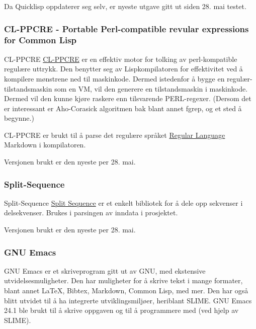 \documentclass[11pt]{article}
\begin{document}
Da Quicklisp oppdaterer seg selv, er nyeste utgave gitt ut siden 28. mai testet.



\subsubsection{CL-PPCRE - Portable Perl-compatible revular expressions for Common Lisp}



CL-PPCRE \href{(http://weitz.de/cl-ppcre/}{CL-PPCRE} er en effektiv motor for tolking av perl-kompatible regulære uttrykk. Den benytter seg av Lispkompilatoren for effektivitet ved å kompilere mønstrene ned til maskinkode. Dermed istedenfor å bygge en regulær-tilstandsmaskin som en VM, vil den generere en tilstandsmaskin i maskinkode. Dermed vil den kunne kjøre raskere enn tilsvarende PERL-regexer. (Dersom det er interessant er Aho-Corasick algoritmen bak blant annet fgrep, og et sted å begynne.)



CL-PPCRE er brukt til å parse det regulære språket \href{(http://en.wikipedia.org/wiki/Regular)language}{Regular Language} Markdown i kompilatoren.



Versjonen brukt er den nyeste per 28. mai.



\subsubsection{Split-Sequence}
Split-Sequence \href{(http://www.cliki.net/split-sequence}{Split Sequence} er et enkelt bibliotek for å dele opp sekvenser i delsekvenser.
Brukes i parsingen av inndata i prosjektet.



Versjonen brukt er den nyeste per 28. mai.



\subsubsection{GNU Emacs}



GNU Emacs er et skriveprogram gitt ut av GNU, med ekstensive utvidelsesmuligheter. Den har muligheter for å skrive tekst i mange formater, blant annet LaTeX, Bibtex, Markdown, Common Lisp, med mer. Den har også blitt utvidet til å ha integrerte utviklingsmiljøer, heriblant SLIME. GNU Emacs 24.1 ble brukt til å skrive oppgaven og til å programmere med (ved hjelp av SLIME).
\end{document}
